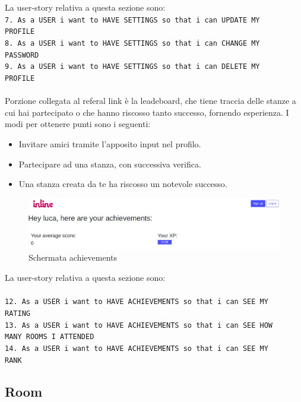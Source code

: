 	La user-story relativa a questa sezione sono:\\
	\texttt{7. As a USER i want to HAVE SETTINGS so that i can UPDATE MY \\ PROFILE}\\
	\texttt{8. As a USER i want to HAVE SETTINGS so that i can CHANGE MY \\ PASSWORD}\\
	\texttt{9. As a USER i want to HAVE SETTINGS so that i can DELETE MY \\ PROFILE}\\
	\\
	Porzione collegata al referal link è la leadeboard, che tiene traccia delle stanze a cui hai partecipato o che hanno riscosso tanto successo, fornendo esperienza. I modi per ottenere punti sono i seguenti:
	\begin{itemize}	
		\item Invitare amici tramite l'apposito input nel profilo.
		\item Partecipare ad una stanza, con successiva verifica.
		\item Una stanza creata da te ha riscosso un notevole successo.
	\end{itemize}

	\begin{figure}[H]
		\includegraphics[width=\columnwidth]{./media/image6.png}
		\caption{Schermata achievements}
	\end{figure}

	La user-story relativa a questa sezione sono:\\\\
	\texttt{12. As a USER i want to HAVE ACHIEVEMENTS so that i can SEE MY \\ RATING}\\
	\texttt{13. As a USER i want to HAVE ACHIEVEMENTS so that i can SEE HOW \\ MANY ROOMS I ATTENDED}\\
	\texttt{14. As a USER i want to HAVE ACHIEVEMENTS so that i can SEE MY \\ RANK}

	\subsection{Room}
	
